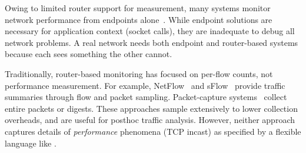 

 Owing to limited router support for
measurement, many systems monitor network performance from endpoints
alone~\cite{netpoirot, minlan-snap, dapper-sosr, trumpet, azure-smartnic}.
While endpoint solutions are necessary for application context (\eg socket
calls), they are inadequate to debug all network problems. A real network needs
both endpoint and router-based systems because each sees something the other
cannot.

 Traditionally, router-based monitoring has
focused on per-flow counts, not performance measurement. For example,
NetFlow~\cite{netflow} and sFlow~\cite{sflow} provide traffic summaries
through flow and packet sampling. Packet-capture systems~\cite{cisco-span,
niksun, netsight, everflow, pathdump, path_query} collect entire packets or
digests. These approaches sample extensively to lower collection
overheads, and are useful for posthoc traffic analysis. However, neither
approach captures details of {\em performance} phenomena (\eg TCP incast) as
specified by a flexible language like \TheSystem.

